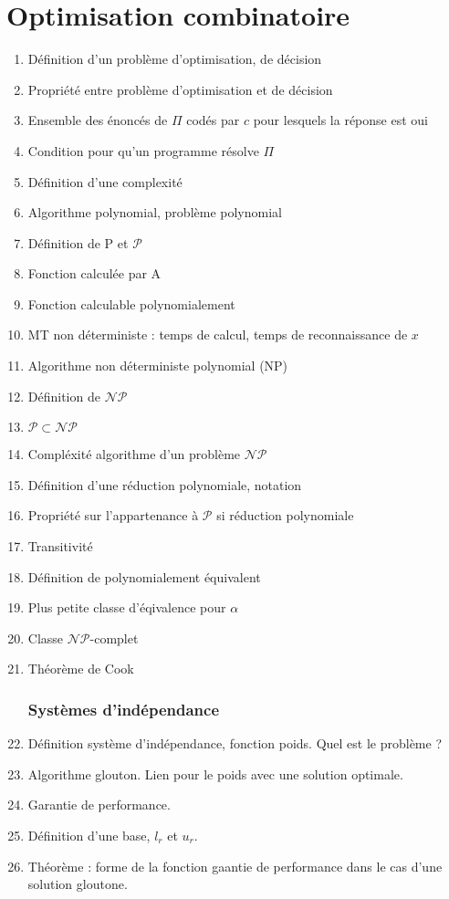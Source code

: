\documentclass[11pt, twocolumn, landscape]{article}
\begin{document}
\part{Optimisation combinatoire}
\begin{enumerate}
\section{Problèmes polynomiaux}
	\item Définition d'un problème d'optimisation, de décision
	\item Propriété entre problème d'optimisation et de décision
	\item Ensemble des énoncés de $\Pi$ codés par $c$ pour lesquels la réponse est oui
	\item Condition pour qu'un programme résolve $\Pi$
	\item Définition d'une complexité
	\item Algorithme polynomial, problème polynomial
	\item Définition de P et $\mathcal{P}$
	\item Fonction calculée par A
	\item Fonction calculable polynomialement
	\item MT non déterministe : temps de calcul, temps de reconnaissance de $x$
	\item Algorithme non déterministe polynomial (NP)
	\item Définition de $\mathcal{N}\mathcal{P}$
	\item $\mathcal{P}\subset\mathcal{N}\mathcal{P}$
	\item Compléxité algorithme d'un problème $\mathcal{NP}$
	\item Définition d'une réduction polynomiale, notation
	\item Propriété sur l'appartenance à $\mathcal{P}$ si réduction polynomiale
	\item Transitivité
	\item Définition de polynomialement équivalent
	\item Plus petite classe d'éqivalence pour $\alpha$
	\item Classe $\mathcal{NP}$-complet
	\item Théorème de Cook
\section{Systèmes d'indépendance}
	\item Définition système d'indépendance, fonction poids. Quel est le problème ?
	\item Algorithme glouton. Lien pour le poids avec une solution optimale.
	\item Garantie de performance.
	\item Définition d'une base, $l_r$ et $u_r$.
	\item Théorème : forme de la fonction gaantie de performance dans le cas d'une solution gloutone.
\end{enumerate}
\end{document}

